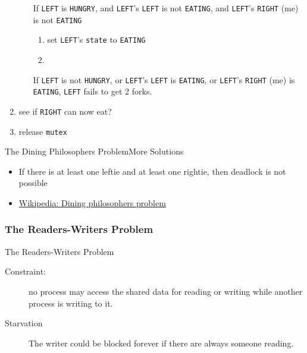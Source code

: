 \begin{enumerate}
\begin{enumerate}
  \item [If] \texttt{LEFT} is \texttt{HUNGRY}, and \texttt{LEFT}'s \texttt{LEFT} is not
    \texttt{EATING}, and \texttt{LEFT}'s \texttt{RIGHT} (me) is not
    \texttt{EATING}
    \begin{enumerate}
    \item set \texttt{LEFT}'s \texttt{state} to \texttt{EATING}
    \item {} 
    \end{enumerate}
  \item [If] \texttt{LEFT} is not \texttt{HUNGRY}, or \texttt{LEFT}'s \texttt{LEFT} is
    \texttt{EATING}, or \texttt{LEFT}'s \texttt{RIGHT} (me) is \texttt{EATING}, \texttt{LEFT} fails
    to get 2 forks.
  \end{enumerate}
\item {} see if \texttt{RIGHT} can now eat?
\item release \texttt{mutex}
\end{enumerate}

\begin{frame}{The Dining Philosophers Problem}{More Solutions}
  \begin{itemize}
  \item If there is at least one leftie and at least one rightie, then
      deadlock is not possible
  \item \href{http://en.wikipedia.org/wiki/Dining_philosophers_problem}{Wikipedia: Dining
      philosophers problem}
  \end{itemize}
\end{frame}

\subsubsection{The Readers-Writers Problem}

\begin{frame}{The Readers-Writers Problem}
  \begin{description}
  \item[Constraint:] no process may access the shared data for reading or writing while
    another process is writing to it.
  \end{description}
  \begin{center}
  \end{center}
  \pause
  \begin{description}
  \item[Starvation] The writer could be blocked forever if there are always someone
    reading.
  \end{description}
\end{frame}


